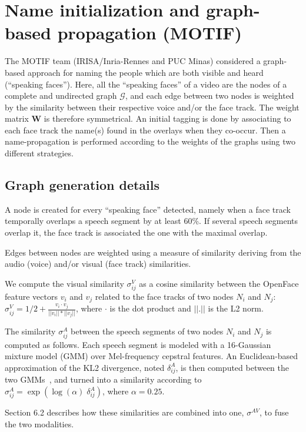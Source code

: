 \section{Name initialization and graph-based propagation (MOTIF)}
\label{sec:graph}

The MOTIF team (IRISA/Inria-Rennes and PUC Minas) considered a graph-based approach for naming the people which are both visible and heard (``speaking faces''). Here, all the ``speaking faces'' of a video are the nodes of a complete and undirected graph $\mathcal{G}$, and each edge between two nodes is weighted by the similarity between their respective voice and/or the face track. The weight matrix $\mathbf{W}$ is therefore symmetrical. An initial tagging is done by associating to each face track the name(s) found in the overlays when they co-occur. Then a name-propagation is performed according to the weights of the graphs using two different strategies.

\subsection{Graph generation details}
\label{ssec:graph_gen}
A node is created for every ``speaking face'' detected, namely when a face track temporally overlaps a speech segment by at least 60\%. If several speech segments overlap it, the face track is associated the one with the maximal overlap.

Edges between nodes are weighted using a measure of similarity deriving from the audio (voice) and/or visual (face track) similarities.

We compute the visual similarity $\sigma^V_{ij}$ as a cosine similarity between the OpenFace feature vectors $v_i$ and $v_j$ related to the face tracks of two nodes $N_i$ and $N_j$: $\sigma^V_{ij}=1/2+\frac{v_i\cdot v_j}{||v_i||*||v_j||}$, where $\cdot$ is the dot product and $||.||$ is the L2 norm.

The similarity $\sigma^A_{ij}$ between the speech segments of two nodes  $N_i$ and $N_j$ is computed as follows. Each speech segment is modeled with a 16-Gaussian mixture model (GMM) over Mel-frequency cepstral features. An Euclidean-based approximation of the KL2 divergence, noted $\delta^A_{ij}$, is then computed between the two GMMs~\cite{Ben}, and turned into a similarity according to $\sigma^A_{ij}=\exp(\log{(\alpha)} \; \delta^A_{ij})$, where $\alpha = 0.25$.

Section 6.2 describes how these similarities are combined into one, $\sigma^{AV}$, to fuse the two modalities.


